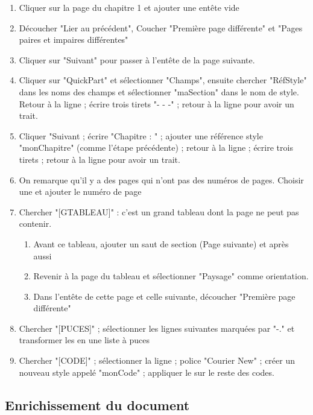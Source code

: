 \documentclass[11pt, a4paper]{article}
\begin{document}
\begin{enumerate}
	\item Cliquer sur la page du chapitre 1 et ajouter une entête vide 
	\item Découcher "Lier au précédent", Coucher "Première page différente" et "Pages paires et impaires différentes"
	\item Cliquer sur "Suivant" pour passer à l'entête de la page suivante.
	\item Cliquer sur "QuickPart" et sélectionner "Champs", ensuite chercher "RéfStyle" dans les noms des champs et sélectionner "maSection" dans le nom de style. Retour à la ligne ; écrire trois tirets "- - -" ; retour à la ligne pour avoir un trait.
	\item Cliquer "Suivant ; écrire "Chapitre : " ; ajouter une référence style "monChapitre" (comme l'étape précédente) ; retour à la ligne ; écrire trois tirets ; retour à la ligne pour avoir un trait.
	\item On remarque qu'il y a des pages qui n'ont pas des  numéros de pages. Choisir une et ajouter le numéro de page
	
	\item Chercher "[GTABLEAU]" : c'est un grand tableau dont la page ne peut pas contenir. 
	\begin{enumerate}
		\item Avant ce tableau, ajouter un saut de section (Page suivante) et après aussi
		\item Revenir à la page du tableau et sélectionner "Paysage" comme orientation.
		\item Dans l'entête de cette page et celle suivante, découcher "Première page différente"
	\end{enumerate}
	
	\item Chercher "[PUCES]" ; sélectionner les lignes suivantes marquées par "-." et transformer les en une liste à puces
	\item Chercher "[CODE]" ; sélectionner la ligne ; police "Courier New" ; créer un nouveau style appelé "monCode" ; appliquer le sur le reste des codes.
	
\end{enumerate}

\subsection*{Enrichissement du document}
\end{document}
